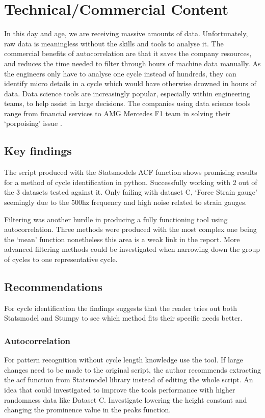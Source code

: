 \section{Technical/Commercial Content}
In this day and age, we are receiving massive amounts of data. Unfortunately, raw data is meaningless without the skills and tools to analyse it.
The commercial benefits of autocorrelation are that it saves the company resources, and reduces the time needed to filter through hours of machine data manually. As the engineers only have to analyse one cycle instead of hundreds, they can identify micro details in a cycle which would have otherwise drowned in hours of data. Data science tools are increasingly popular, especially within engineering teams, to help assist in large decisions. The companies using data science tools range from financial services to AMG Mercedes F1 team in solving their `porpoising' issue \cite{mercedes}. 
\subsection{Key findings}
The script produced with the Statsmodels ACF function shows promising results for a  method of cycle identification in python. Successfully working with 2 out of the 3 datasets tested against it. Only failing with dataset C, `Force Strain gauge' seemingly due to the 500hz frequency and high noise related to strain gauges.

Filtering was another hurdle in producing a fully functioning tool using autocorrelation. Three methods were produced with the most complex one being the `mean' function nonetheless this area is a weak link in the report. More advanced filtering methods could be investigated when narrowing down the group of cycles to one representative cycle. 

\subsection{Recommendations}
For cycle identification the findings suggests that the reader tries out both Statsmodel and Stumpy to see which method fits their specific needs better. 
\subsubsection{Autocorrelation}
For pattern recognition without cycle length knowledge use the tool. If large changes need to be made to the original script, the author recommends extracting the acf function from Statsmodel library instead of editing the whole script. 
An idea that could investigated to improve the tools performance with higher randomness data like Dataset C. Investigate lowering the height constant and changing the prominence value in the peaks function. 

